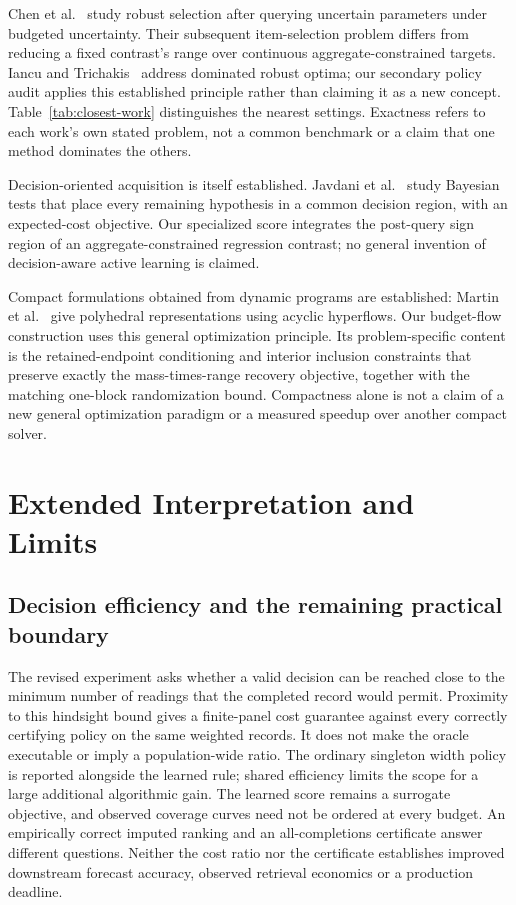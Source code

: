 \documentclass[12pt]{article}
\begin{document}
Chen et al.~\cite{chen2026} study robust selection after querying uncertain
parameters under budgeted uncertainty. Their subsequent item-selection
problem differs from reducing a fixed contrast's range over continuous
aggregate-constrained targets. Iancu and Trichakis~\cite{iancu2014} address
dominated robust optima; our secondary policy audit applies this established
principle rather than claiming it as a new concept.
Table~\ref{tab:closest-work} distinguishes the nearest settings. Exactness
refers to each work's own stated problem, not a common benchmark or a claim
that one method dominates the others.


Decision-oriented acquisition is itself established. Javdani et al.~\cite{javdani2014}
study Bayesian tests that place every remaining hypothesis in a common
decision region, with an expected-cost objective. Our specialized score
integrates the post-query sign region of an aggregate-constrained regression
contrast; no general invention of decision-aware active learning is claimed.

Compact formulations obtained from dynamic programs are established:
Martin et al.~\cite{martin1990} give polyhedral representations using
acyclic hyperflows. Our budget-flow construction uses this general
optimization principle. Its problem-specific content is the retained-endpoint
conditioning and interior inclusion constraints that preserve exactly the
mass-times-range recovery objective, together with the matching one-block
randomization bound. Compactness alone is not a claim of a new general
optimization paradigm or a measured speedup over another compact solver.


\FloatBarrier
\section{Extended Interpretation and Limits}\label{app:extended-interpretation}
\subsection{Decision efficiency and the remaining practical boundary}
The revised experiment asks whether a valid decision can be reached close
to the minimum number of readings that the completed record would permit.
Proximity to this hindsight bound gives a finite-panel cost guarantee
against every correctly certifying policy on the same weighted records.
It does not make the oracle executable or imply a population-wide ratio.
The ordinary singleton width policy is reported alongside the learned rule;
shared efficiency limits the scope for a large additional algorithmic gain.
The learned score remains a surrogate objective, and observed coverage
curves need not be ordered at every budget. An empirically correct imputed
ranking and an all-completions certificate answer different questions.
Neither the cost ratio nor the certificate establishes improved downstream
forecast accuracy, observed retrieval economics or a production deadline.
\end{document}

